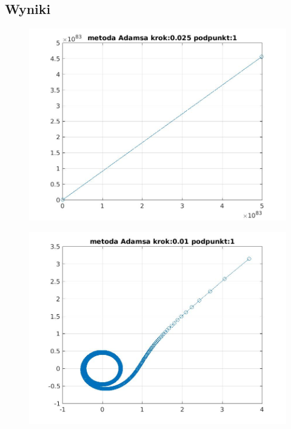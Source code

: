 \documentclass[a4paper, 12pt]{article}
\begin{document}
\subsection{Wyniki}
\begin{figure}[H]
\centering
\includegraphics[width = 15cm]{2d/metoda Adamsa krok:0,025 podpunkt:1.jpg}
\end{figure}
\begin{figure}[H]
\centering
\includegraphics[width = 15cm]{2d/metoda Adamsa krok:0,01 podpunkt:1.jpg}
\end{figure}
\end{document}
